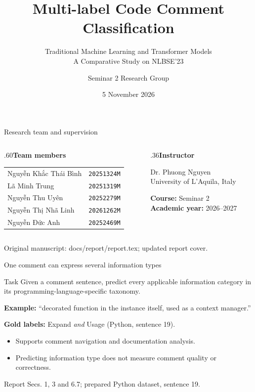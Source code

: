 \documentclass[aspectratio=169,10pt]{beamer}
\title[Code Comment Classification]{Multi-label Code Comment\\Classification}
\subtitle{Traditional Machine Learning and Transformer Models\\A Comparative Study on NLBSE'23}
\author[Seminar 2 Research Group]{Seminar 2 Research Group}
\institute{Hanoi University of Science and Technology\\School of Information \& Communication Technology}
\date{5 November 2026}
\newcommand{\src}[1]{\vfill{\tiny\color{gray}#1\par}}
\begin{document}
\begin{frame}[plain]\titlepage\end{frame}
\begin{frame}{Research team and supervision}
\begin{columns}[T]
\begin{column}{.60\textwidth}\textbf{Team members}\par\medskip
\begin{tabular}{@{}ll@{}}
Nguyễn Khắc Thái Bình & \texttt{20251324M}\\
Lã Minh Trung & \texttt{20251319M}\\
Nguyễn Thu Uyên & \texttt{20252279M}\\
Nguyễn Thị Nhã Linh & \texttt{20261262M}\\
Nguyễn Đức Anh & \texttt{20252469M}\\
\end{tabular}\par\end{column}
\begin{column}{.36\textwidth}\textbf{Instructor}\medskip

Dr. Phuong Nguyen\\University of L'Aquila, Italy
\medskip

\textbf{Course:} Seminar 2\\\textbf{Academic year:} 2026--2027
\end{column}\end{columns}
\src{Original manuscript: docs/report/report.tex; updated report cover.}
\end{frame}

\begin{frame}{One comment can express several information types}
\begin{block}{Task}
Given a comment sentence, predict every applicable information category in its programming-language-specific taxonomy.
\end{block}
\medskip
\textbf{Example:} ``decorated function in the instance itself, used as a context manager.''
\medskip

\textbf{Gold labels:} Expand \emph{and} Usage (Python, sentence 19).
\medskip
\begin{itemize}\item Supports comment navigation and documentation analysis.
\item Predicting information type does not measure comment quality or correctness.\end{itemize}
\src{Report Secs. 1, 3 and 6.7; prepared Python dataset, sentence 19.}
\end{frame}
\end{document}
